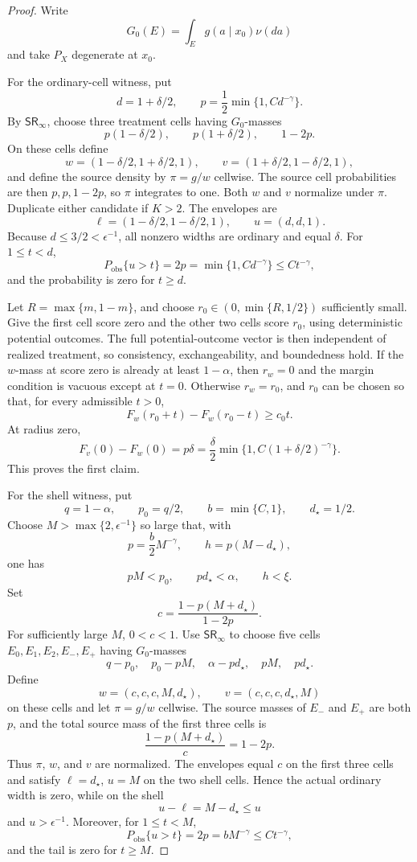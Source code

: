 \documentclass{article}
\begin{document}
\begin{proof}
Write
\[
G_0(E)=\int_Eg(a\mid x_0)\nu(da)
\]
and take \(P_X\) degenerate at \(x_0\).

For the ordinary-cell witness, put
\[
d=1+\delta/2,\qquad
p=\frac12\min\{1,Cd^{-\gamma}\}.
\]
By \(\mathsf{SR}_\infty\), choose three treatment cells having \(G_0\)-masses
\[
p(1-\delta/2),\qquad p(1+\delta/2),\qquad 1-2p.
\]
On these cells define
\[
w=(1-\delta/2,1+\delta/2,1),\qquad
v=(1+\delta/2,1-\delta/2,1),
\]
and define the source density by \(\pi=g/w\) cellwise. The source cell probabilities are then \(p,p,1-2p\), so \(\pi\) integrates to one. Both \(w\) and \(v\) normalize under \(\pi\). Duplicate either candidate if \(K>2\). The envelopes are
\[
\ell=(1-\delta/2,1-\delta/2,1),\qquad
u=(d,d,1).
\]
Because \(d\le3/2<\epsilon^{-1}\), all nonzero widths are ordinary and equal \(\delta\). For \(1\le t<d\),
\[
P_{\mathrm{obs}}\{u>t\}=2p
 =\min\{1,Cd^{-\gamma}\}\le Ct^{-\gamma},
\]
and the probability is zero for \(t\ge d\).

Let \(R=\max\{m,1-m\}\), and choose \(r_0\in(0,\min\{R,1/2\})\) sufficiently small. Give the first cell score zero and the other two cells score \(r_0\), using deterministic potential outcomes. The full potential-outcome vector is then independent of realized treatment, so consistency, exchangeability, and boundedness hold. If the \(w\)-mass at score zero is already at least \(1-\alpha\), then \(r_w=0\) and the margin condition is vacuous except at \(t=0\). Otherwise \(r_w=r_0\), and \(r_0\) can be chosen so that, for every admissible \(t>0\),
\[
F_w(r_0+t)-F_w(r_0-t)\ge c_0t.
\]
At radius zero,
\[
F_v(0)-F_w(0)
 =p\delta
 =\frac{\delta}{2}\min\{1,C(1+\delta/2)^{-\gamma}\}.
\]
This proves the first claim.

For the shell witness, put
\[
q=1-\alpha,\qquad p_0=q/2,\qquad
b=\min\{C,1\},\qquad d_\star=1/2.
\]
Choose \(M>\max\{2,\epsilon^{-1}\}\) so large that, with
\[
p=\frac b2M^{-\gamma},\qquad
h=p(M-d_\star),
\]
one has
\[
pM<p_0,\qquad pd_\star<\alpha,\qquad h<\xi.
\]
Set
\[
c=\frac{1-p(M+d_\star)}{1-2p}.
\]
For sufficiently large \(M\), \(0<c<1\). Use \(\mathsf{SR}_\infty\) to choose five cells \(E_0,E_1,E_2,E_-,E_+\) having \(G_0\)-masses
\[
q-p_0,\quad p_0-pM,\quad \alpha-pd_\star,\quad pM,\quad pd_\star.
\]
Define
\[
w=(c,c,c,M,d_\star),\qquad
v=(c,c,c,d_\star,M)
\]
on these cells and let \(\pi=g/w\) cellwise. The source masses of \(E_-\) and \(E_+\) are both \(p\), and the total source mass of the first three cells is
\[
\frac{1-p(M+d_\star)}c=1-2p.
\]
Thus \(\pi\), \(w\), and \(v\) are normalized. The envelopes equal \(c\) on the first three cells and satisfy \(\ell=d_\star\), \(u=M\) on the two shell cells. Hence the actual ordinary width is zero, while on the shell
\[
u-\ell=M-d_\star\le u
\]
and \(u>\epsilon^{-1}\). Moreover, for \(1\le t<M\),
\[
P_{\mathrm{obs}}\{u>t\}=2p=bM^{-\gamma}\le Ct^{-\gamma},
\]
and the tail is zero for \(t\ge M\).


\end{proof}
\end{document}
